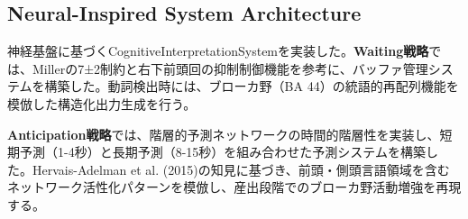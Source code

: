 \subsection{Neural-Inspired System Architecture}

神経基盤に基づくCognitiveInterpretationSystemを実装した。\textbf{Waiting戦略}では、Millerの7±2制約と右下前頭回の抑制制御機能を参考に、バッファ管理システムを構築した。動詞検出時には、ブローカ野（BA 44）の統語的再配列機能を模倣した構造化出力生成を行う。

\textbf{Anticipation戦略}では、階層的予測ネットワークの時間的階層性を実装し、短期予測（1-4秒）と長期予測（8-15秒）を組み合わせた予測システムを構築した。Hervais-Adelman et al. (2015)の知見に基づき、前頭・側頭言語領域を含むネットワーク活性化パターンを模倣し、産出段階でのブローカ野活動増強を再現する。 